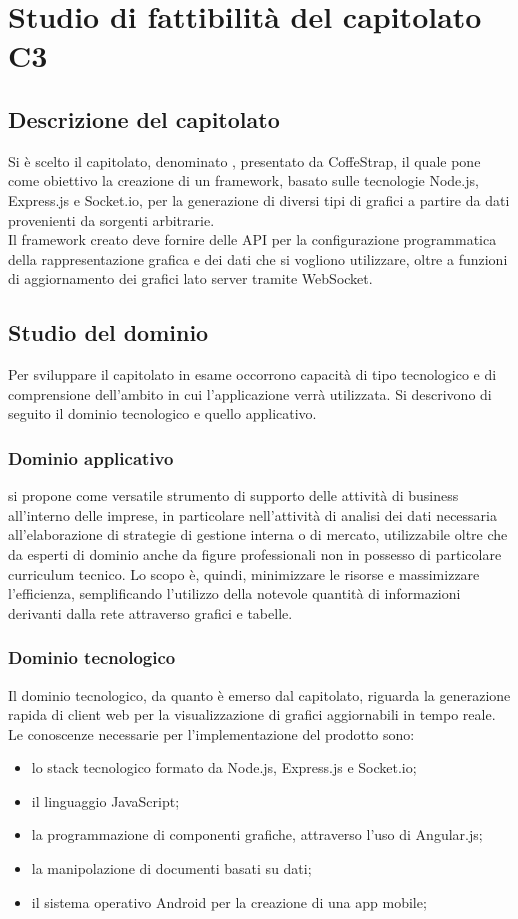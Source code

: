 \section{Studio di fattibilità del capitolato C3}
	\subsection{Descrizione del capitolato}
		Si è scelto il capitolato, denominato \projectname, presentato da CoffeStrap, il quale pone come obiettivo la creazione di un framework, basato sulle tecnologie Node.js, Express.js e Socket.io, per la generazione di diversi tipi di grafici a partire da dati provenienti da sorgenti arbitrarie.\\
		Il framework creato deve fornire delle API per la configurazione programmatica della rappresentazione grafica e dei dati che si vogliono utilizzare, oltre a funzioni di aggiornamento dei grafici lato server tramite WebSocket.
	\subsection{Studio del dominio}
		Per sviluppare il capitolato in esame occorrono capacità di tipo tecnologico e di comprensione dell'ambito in cui l'applicazione verrà utilizzata. Si descrivono di seguito il dominio tecnologico e quello applicativo.
		\subsubsection{Dominio applicativo}
			\projectname si propone come versatile strumento di supporto delle attività di business all'interno delle imprese, in particolare nell'attività di analisi dei dati necessaria all'elaborazione di strategie di gestione interna o di mercato, utilizzabile oltre che da esperti di dominio anche da figure professionali non in possesso di particolare curriculum tecnico. Lo scopo è, quindi, minimizzare le risorse e massimizzare l'efficienza, semplificando l'utilizzo della notevole quantità di informazioni derivanti dalla rete attraverso grafici e tabelle.
		\subsubsection{Dominio tecnologico}
			Il dominio tecnologico, da quanto è emerso dal capitolato, riguarda la generazione rapida di client web per la visualizzazione di grafici aggiornabili in tempo reale.\\
			Le conoscenze necessarie per l'implementazione del prodotto sono:
			\begin{itemize}
				\item lo stack tecnologico formato da Node.js, Express.js e Socket.io;
				\item il linguaggio JavaScript;
				\item la programmazione di componenti grafiche, attraverso l'uso di Angular.js;
				\item la manipolazione di documenti basati su dati;
				\item il sistema operativo Android per la creazione di una app mobile;
			\end{itemize}
